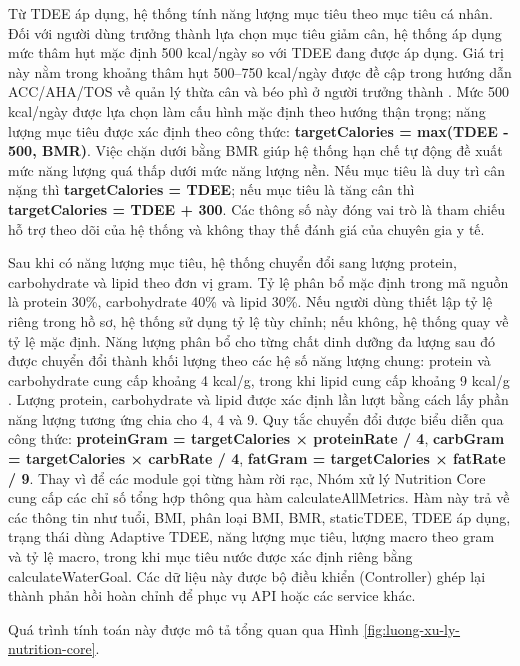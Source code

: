 \documentclass[12pt, a4paper]{report}
\begin{document}
Từ TDEE áp dụng, hệ thống tính năng lượng mục tiêu theo mục tiêu cá nhân. Đối với người dùng trưởng thành lựa chọn mục tiêu giảm cân, hệ thống áp dụng mức thâm hụt mặc định 500 kcal/ngày so với TDEE đang được áp dụng. Giá trị này nằm trong khoảng thâm hụt 500–750 kcal/ngày được đề cập trong hướng dẫn ACC/AHA/TOS về quản lý thừa cân và béo phì ở người trưởng thành \cite{jensen2014}. Mức 500 kcal/ngày được lựa chọn làm cấu hình mặc định theo hướng thận trọng; năng lượng mục tiêu được xác định theo công thức: \textbf{targetCalories = max(TDEE - 500, BMR)}. Việc chặn dưới bằng BMR giúp hệ thống hạn chế tự động đề xuất mức năng lượng quá thấp dưới mức năng lượng nền. Nếu mục tiêu là duy trì cân nặng thì \textbf{targetCalories = TDEE}; nếu mục tiêu là tăng cân thì \textbf{targetCalories = TDEE + 300}. Các thông số này đóng vai trò là tham chiếu hỗ trợ theo dõi của hệ thống và không thay thế đánh giá của chuyên gia y tế.

Sau khi có năng lượng mục tiêu, hệ thống chuyển đổi sang lượng protein, carbohydrate và lipid theo đơn vị gram. Tỷ lệ phân bổ mặc định trong mã nguồn là protein 30\%, carbohydrate 40\% và lipid 30\%. Nếu người dùng thiết lập tỷ lệ riêng trong hồ sơ, hệ thống sử dụng tỷ lệ tùy chỉnh; nếu không, hệ thống quay về tỷ lệ mặc định. Năng lượng phân bổ cho từng chất dinh dưỡng đa lượng sau đó được chuyển đổi thành khối lượng theo các hệ số năng lượng chung: protein và carbohydrate cung cấp khoảng 4 kcal/g, trong khi lipid cung cấp khoảng 9 kcal/g \cite{vien_dinh_duong_2007, fao_2003}. Lượng protein, carbohydrate và lipid được xác định lần lượt bằng cách lấy phần năng lượng tương ứng chia cho 4, 4 và 9. Quy tắc chuyển đổi được biểu diễn qua công thức: \textbf{proteinGram = targetCalories × proteinRate / 4}, \textbf{carbGram = targetCalories × carbRate / 4}, \textbf{fatGram = targetCalories × fatRate / 9}.
Thay vì để các module gọi từng hàm rời rạc, Nhóm xử lý Nutrition Core cung cấp các chỉ số tổng hợp thông qua hàm calculateAllMetrics. Hàm này trả về các thông tin như tuổi, BMI, phân loại BMI, BMR, staticTDEE, TDEE áp dụng, trạng thái dùng Adaptive TDEE, năng lượng mục tiêu, lượng macro theo gram và tỷ lệ macro, trong khi mục tiêu nước được xác định riêng bằng calculateWaterGoal. Các dữ liệu này được bộ điều khiển (Controller) ghép lại thành phản hồi hoàn chỉnh để phục vụ API hoặc các service khác.

Quá trình tính toán này được mô tả tổng quan qua Hình \ref{fig:luong-xu-ly-nutrition-core}.
\end{document}
